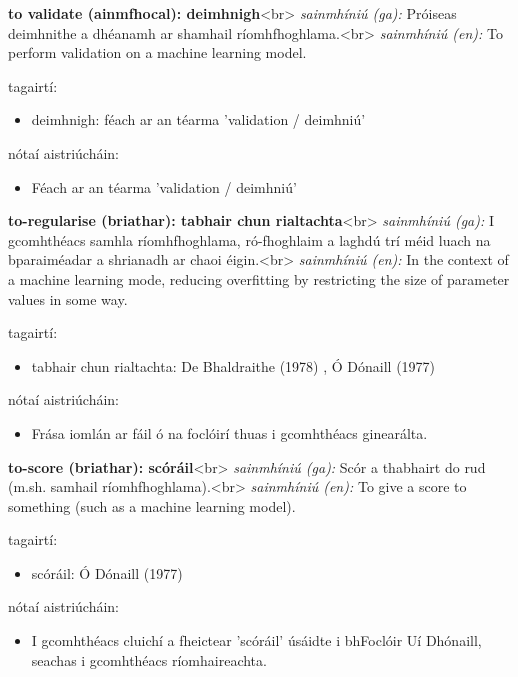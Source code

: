 \documentclass{article}
\begin{document}
\textbf{to validate (ainmfhocal): deimhnigh}<br>
\textit{sainmhíniú (ga):} Próiseas deimhnithe a dhéanamh ar shamhail ríomhfhoghlama.<br>
\textit{sainmhíniú (en):} To perform validation on a machine learning model.

tagairtí:
\begin{itemize}
	\item deimhnigh: féach ar an téarma 'validation / deimhniú'
\end{itemize}

nótaí aistriúcháin:
\begin{itemize}
	\item Féach ar an téarma 'validation / deimhniú'
\end{itemize}


\textbf{to-regularise (briathar): tabhair chun rialtachta}<br>
\textit{sainmhíniú (ga):} I gcomhthéacs samhla ríomhfhoghlama, ró-fhoghlaim a laghdú trí méid luach na bparaiméadar a shrianadh ar chaoi éigin.<br>
\textit{sainmhíniú (en):} In the context of a machine learning mode, reducing overfitting by restricting the size of parameter values in some way.

tagairtí:
\begin{itemize}
	\item tabhair chun rialtachta: De Bhaldraithe (1978) \cite{de-bhaldraithe}, Ó Dónaill (1977) \cite{odonaill}
\end{itemize}

nótaí aistriúcháin:
\begin{itemize}
	\item Frása iomlán ar fáil ó na foclóirí thuas i gcomhthéacs ginearálta.
\end{itemize}


\textbf{to-score (briathar): scóráil}<br>
\textit{sainmhíniú (ga):} Scór a thabhairt do rud (m.sh. samhail ríomhfhoghlama).<br>
\textit{sainmhíniú (en):} To give a score to something (such as a machine learning model).

tagairtí:
\begin{itemize}
	\item scóráil: Ó Dónaill (1977) \cite{odonaill}
\end{itemize}

nótaí aistriúcháin:
\begin{itemize}
	\item I gcomhthéacs cluichí a fheictear 'scóráil' úsáidte i bhFoclóir Uí Dhónaill, seachas i gcomhthéacs ríomhaireachta.
\end{itemize}
\end{document}
